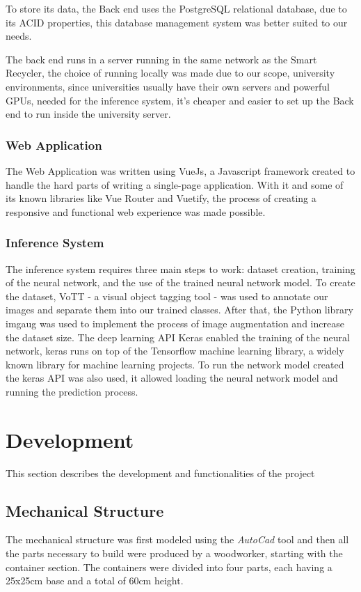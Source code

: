 \documentclass[a4paper,11pt]{article}
\begin{document}
To store its data, the Back end uses the PostgreSQL\cite{postgre} relational database, due to its ACID properties, this database management system was better suited to our needs.

The back end runs in a server running in the same network as the Smart Recycler, the choice of running locally was made due to our scope, university environments, since universities usually have their own servers and powerful GPUs, needed for the inference system, it’s cheaper and easier to set up the Back end to run inside the university server.


\subsubsection{Web Application}
The Web Application was written using VueJs\cite{vuejs}, a Javascript framework created to handle the hard parts of writing a single-page application. With it and some of its known libraries like Vue Router and Vuetify, the process of creating a responsive and functional web experience was made possible.

\subsubsection{Inference System}
The inference system requires three main steps to work: dataset creation, training of the neural network, and the use of the trained neural network model. To create the dataset, VoTT\cite{vott} - a visual object tagging tool - was used to annotate our images and separate them into our trained classes. After that, the Python library imgaug was used to implement the process of image augmentation and increase the dataset size. The deep learning API Keras\cite{keras} enabled the training of the neural network, keras runs on top of the Tensorflow\cite{tensorflow} machine learning library, a widely known library for machine learning projects. To run the network model created the keras API was also used, it allowed loading the neural network model and running the prediction process.

\section{Development}
\label{sec:dev}
This section describes the development and functionalities of the project

\subsection{Mechanical Structure}
\label{subsec:Mechanical}
The mechanical structure was first modeled using the \textit{AutoCad} \cite{AutoCad} tool and then all the parts necessary to build were produced by a woodworker, starting with the container section. The containers were divided into four parts, each having a 25x25cm base and a total of 60cm height.
\end{document}
